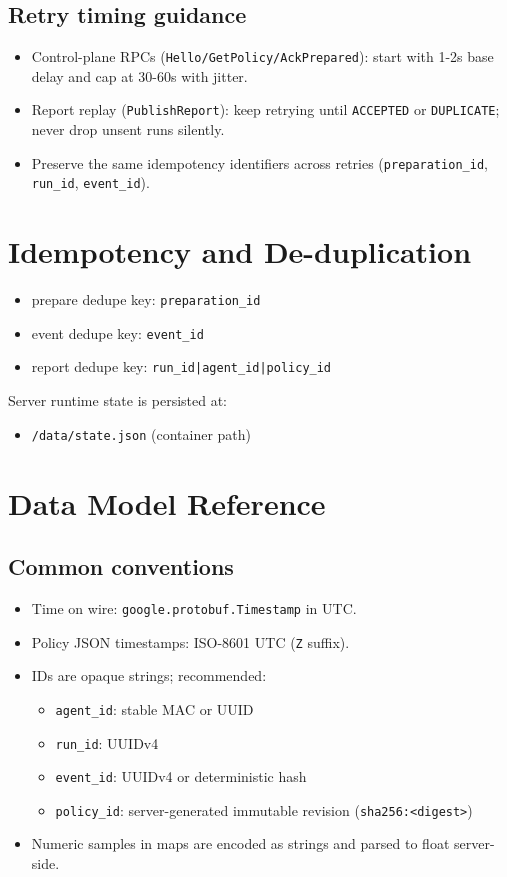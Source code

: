 \documentclass[11pt,a4paper]{article}
\begin{document}
\subsection{Retry timing guidance}
\begin{itemize}
  \item Control-plane RPCs (\texttt{Hello/GetPolicy/AckPrepared}): start with 1-2s base delay and cap at 30-60s with jitter.
  \item Report replay (\texttt{PublishReport}): keep retrying until \texttt{ACCEPTED} or \texttt{DUPLICATE}; never drop unsent runs silently.
  \item Preserve the same idempotency identifiers across retries (\texttt{preparation\_id}, \texttt{run\_id}, \texttt{event\_id}).
\end{itemize}

\section{Idempotency and De-duplication}
\begin{itemize}
  \item prepare dedupe key: \texttt{preparation\_id}
  \item event dedupe key: \texttt{event\_id}
  \item report dedupe key: \texttt{run\_id|agent\_id|policy\_id}
\end{itemize}

Server runtime state is persisted at:
\begin{itemize}
  \item \texttt{/data/state.json} (container path)
\end{itemize}

\section{Data Model Reference}
\subsection{Common conventions}
\begin{itemize}
  \item Time on wire: \texttt{google.protobuf.Timestamp} in UTC.
  \item Policy JSON timestamps: ISO-8601 UTC (\texttt{Z} suffix).
  \item IDs are opaque strings; recommended:
    \begin{itemize}
      \item \texttt{agent\_id}: stable MAC or UUID
      \item \texttt{run\_id}: UUIDv4
      \item \texttt{event\_id}: UUIDv4 or deterministic hash
      \item \texttt{policy\_id}: server-generated immutable revision (\texttt{sha256:<digest>})
    \end{itemize}
  \item Numeric samples in maps are encoded as strings and parsed to float server-side.
\end{itemize}
\end{document}
